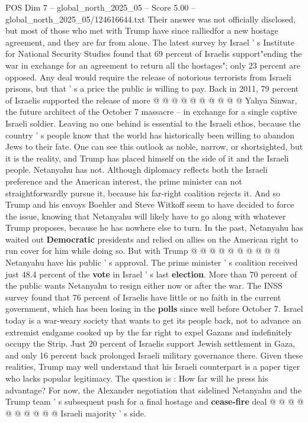 \begin{textsample}{POS Dim 7 – global\_north\_2025\_05 – Score 5.00 – global\_north\_2025\_05/124616644.txt}
Their answer was not officially disclosed, but most of those who met with Trump have since ralliedfor a new hostage agreement, and they are far from alone.
The latest survey by Israel ' s Institute for National Security Studies found that 69 percent of Israelis support"ending the war in exchange for an agreement to return all the hostages"; only 23 percent are opposed.
Any deal would require the release of notorious terrorists from Israeli prisons, but that ' s a price the public is willing to pay.
Back in 2011, 79 percent of Israelis supported the release of more @ @ @ @ @ @ @ @ @ @ Yahya Sinwar, the future architect of the October 7 massacre -- in exchange for a single captive Israeli soldier.
Leaving no one behind is essential to the Israeli ethos, because the country ' s people know that the world has historically been willing to abandon Jews to their fate.
One can see this outlook as noble, narrow, or shortsighted, but it is the reality, and Trump has placed himself on the side of it and the Israeli people.
Netanyahu has not.
Although diplomacy reflects both the Israeli preference and the American interest, the prime minister can not straightforwardly pursue it, because his far-right coalition rejects it.
And so Trump and his envoys Boehler and Steve Witkoff seem to have decided to force the issue, knowing that Netanyahu will likely have to go along with whatever Trump proposes, because he has nowhere else to turn.
In the past, Netanyahu has waited out \textbf{Democratic} presidents and relied on allies on the American right to run cover for him while doing so.
But with Trump @ @ @ @ @ @ @ @ @ @ Netanyahu have his public ' s approval.
The prime minister ' s coalition received just 48.4 percent of the \textbf{vote} in Israel ' s last \textbf{election}.
More than 70 percent of the public wants Netanyahu to resign either now or after the war.
The INSS survey found that 76 percent of Israelis have little or no faith in the current government, which has been losing in the \textbf{polls} since well before October 7.
Israel today is a war-weary society that wants to get its people back, not to advance an extremist endgame cooked up by the far right to expel Gazans and indefinitely occupy the Strip.
Just 20 percent of Israelis support Jewish settlement in Gaza, and only 16 percent back prolonged Israeli military governance there.
Given these realities, Trump may well understand that his Israeli counterpart is a paper tiger who lacks popular legitimacy.
The question is : How far will he press his advantage?
For now, the Alexander negotiation that sidelined Netanyahu and the Trump team ' s subsequent push for a final hostage and \textbf{cease-fire} deal @ @ @ @ @ @ @ @ @ @ Israeli majority ' s side.

\end{textsample}
